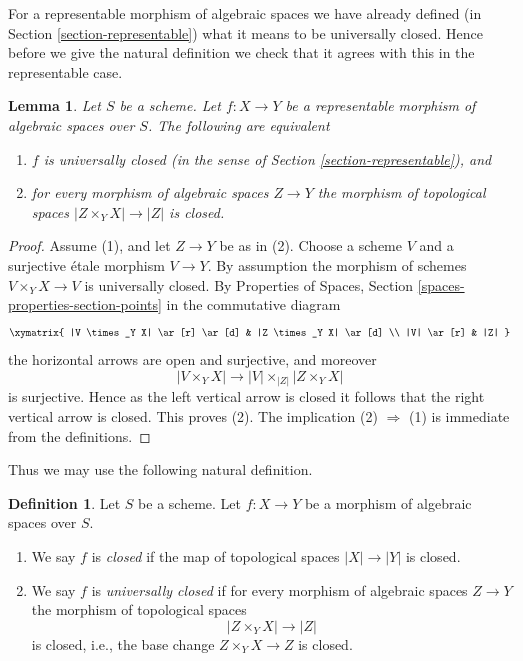 \documentclass{stacks-project}
\theoremstyle{plain}
\newtheorem{lemma}[subsection]{Lemma}
\theoremstyle{definition}
\newtheorem{definition}[subsection]{Definition}
\theoremstyle{remark}
\numberwithin{equation}{subsection}
\begin{document}
\noindent
For a representable morphism of algebraic spaces we have already defined (in
Section \ref{section-representable})
what it means to be universally closed. Hence before we give the natural
definition we check that it agrees with this in the representable case.

\begin{lemma}
\label{lemma-characterize-representable-universally-closed}
Let $S$ be a scheme. Let $f : X \to Y$ be a representable morphism of
algebraic spaces over $S$. The following are equivalent
\begin{enumerate}
\item $f$ is universally closed
(in the sense of Section \ref{section-representable}), and
\item for every morphism of algebraic spaces $Z \to Y$ the morphism of
topological spaces $|Z \times_Y X| \to |Z|$ is closed.
\end{enumerate}
\end{lemma}

\begin{proof}
Assume (1), and let $Z \to Y$ be as in (2). Choose a scheme $V$ and
a surjective \'etale morphism $V \to Y$. By assumption the morphism
of schemes $V \times_Y X \to V$ is universally closed. By
Properties of Spaces, Section \ref{spaces-properties-section-points}
in the commutative diagram
$$
\xymatrix{
|V \times_Y X| \ar[r] \ar[d] & |Z \times_Y X| \ar[d] \\
|V| \ar[r] & |Z|
}
$$
the horizontal arrows are open and surjective, and moreover
$$
|V \times_Y X| \longrightarrow |V| \times_{|Z|} |Z \times_Y X|
$$
is surjective. Hence as the left
vertical arrow is closed it follows that the right vertical arrow is
closed. This proves (2). The implication (2) $\Rightarrow$ (1) is
immediate from the definitions.
\end{proof}

\noindent
Thus we may use the following natural definition.

\begin{definition}
\label{definition-closed}
Let $S$ be a scheme. Let $f : X \to Y$ be a morphism of algebraic spaces
over $S$.
\begin{enumerate}
\item We say $f$ is {\it closed} if the map of topological
spaces $|X| \to |Y|$ is closed.
\item We say $f$ is {\it universally closed} if for every morphism
of algebraic spaces $Z \to Y$ the morphism of topological spaces
$$
|Z \times_Y X| \to |Z|
$$
is closed, i.e., the base change $Z \times_Y X \to Z$ is closed.
\end{enumerate}
\end{definition}
\end{document}
